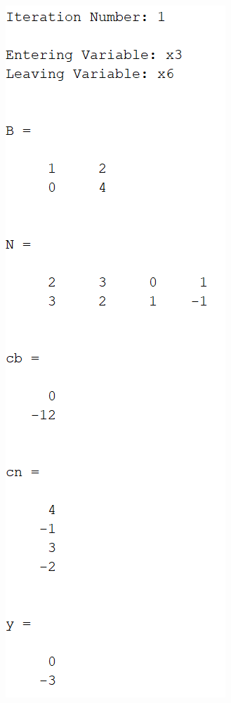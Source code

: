 \documentclass{article}
\begin{document}
\begin{itemize}
\begin{center}
        \includegraphics[scale = 0.7]{2_2_i_iter1}

\end{center}
\end{itemize}
\end{document}
